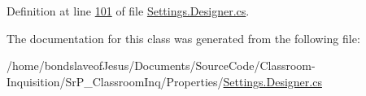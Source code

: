\-Definition at line \hyperlink{_settings_8_designer_8cs_source_l00101}{101} of file \hyperlink{_settings_8_designer_8cs_source}{\-Settings.\-Designer.\-cs}.



\-The documentation for this class was generated from the following file\-:\begin{DoxyCompactItemize}
\item 
/home/bondslaveof\-Jesus/\-Documents/\-Source\-Code/\-Classroom-\/\-Inquisition/\-Sr\-P\-\_\-\-Classroom\-Inq/\-Properties/\hyperlink{_settings_8_designer_8cs}{\-Settings.\-Designer.\-cs}\end{DoxyCompactItemize}
